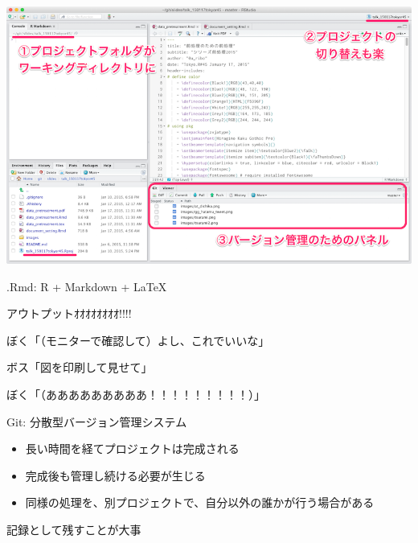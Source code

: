 \documentclass[ignorenonframetext,]{beamer}
\begin{document}
\begin{frame}

\includegraphics[scale = 0.8]{images/rstudio_panel.png}

\end{frame}

\begin{frame}{.Rmd: R + Markdown + \LaTeX}


\end{frame}

\begin{frame}{アウトプットｵｵｵｵｵｵｵｵ!!!!}

ぼく「（モニターで確認して）よし、これでいいな」

ボス「図を印刷して見せて」

ぼく「（あああああああああ！！！！！！！！！）」


\end{frame}

\begin{frame}{Git: 分散型バージョン管理システム}

\begin{itemize}
\itemsep1pt\parskip0pt
\item
  長い時間を経てプロジェクトは完成される
\item
  完成後も管理し続ける必要が生じる
\item
  同様の処理を、別プロジェクトで、自分以外の誰かが行う場合がある
\end{itemize}

\faHandLeft 記録として残すことが大事

\end{frame}
\end{document}
